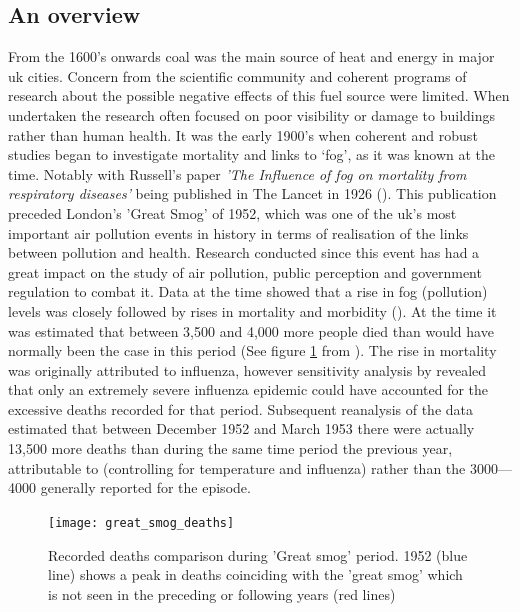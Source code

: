 \subsection{An overview}
\label{subsec:anoverview}



From the 1600’s onwards coal was the main source of heat and energy in major \gls{uk} cities. Concern from the scientific community and coherent programs of research about the possible negative effects of this fuel source were limited. When undertaken the research often focused on poor visibility or damage to buildings rather than human health. It was the early 1900’s when coherent and robust studies began to investigate mortality and links to ‘fog’, as it was known at the time. Notably with Russell’s paper \textit{'The Influence of fog on mortality from respiratory diseases'} being published in The Lancet in 1926 (\cite{Russell1926}). This publication preceded London's 'Great Smog' of 1952, which was one of the \gls{uk}'s most important air pollution events in history in terms of realisation of the links between pollution and health. Research conducted since this event has had a great impact on the study of air pollution, public perception and government regulation to combat it. Data at the time showed that a rise in fog (pollution) levels was closely followed by rises in mortality and morbidity (\cite{Bell2003}). At the time it was estimated that between 3,500 and 4,000 more people died than would have normally been the case in this period (See figure \ref{fig:greatsmogdeaths} from \cite{GreaterLondonAuthorityGLA2002}). The rise in mortality was originally attributed to influenza, however sensitivity analysis by \cite{Bell2003} revealed that only an extremely severe influenza epidemic could have accounted for the excessive deaths recorded for that period. Subsequent reanalysis of the data estimated that between December 1952 and March 1953 there were actually 13,500 more deaths than during the same time period the previous year, attributable to (controlling for temperature and influenza) rather than the 3000--–4000 generally reported for the episode.

\begin{figure}[H]
\centering
\texttt{[image: great\_smog\_deaths]}
\caption{Recorded deaths comparison during 'Great smog' period. 1952 (blue line) shows a peak in deaths coinciding with the 'great smog' which is not seen in the preceding or following years (red lines)}
\label{fig:greatsmogdeaths}
\end{figure}

